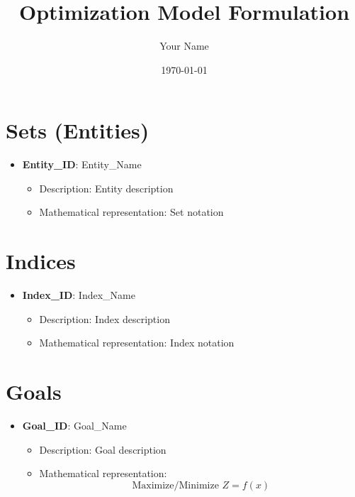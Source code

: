 \documentclass{article}
\title{Optimization Model Formulation}
\author{Your Name}
\date{\today}
\begin{document}
\maketitle

\tableofcontents

\section{Sets (Entities)}
\begin{itemize}
    \item \textbf{Entity\_ID}: Entity\_Name
        \begin{itemize}
            \item Description: Entity description
            \item Mathematical representation: Set notation
        \end{itemize}
\end{itemize}

\section{Indices}
\begin{itemize}
    \item \textbf{Index\_ID}: Index\_Name
        \begin{itemize}
            \item Description: Index description
            \item Mathematical representation: Index notation
        \end{itemize}
\end{itemize}

\section{Goals}
\begin{itemize}
    \item \textbf{Goal\_ID}: Goal\_Name
        \begin{itemize}
            \item Description: Goal description
            \item Mathematical representation: 
                \begin{equation}
                    \text{Maximize/Minimize } Z = f(x)
                \end{equation}
        \end{itemize}
\end{itemize}
\end{document}
